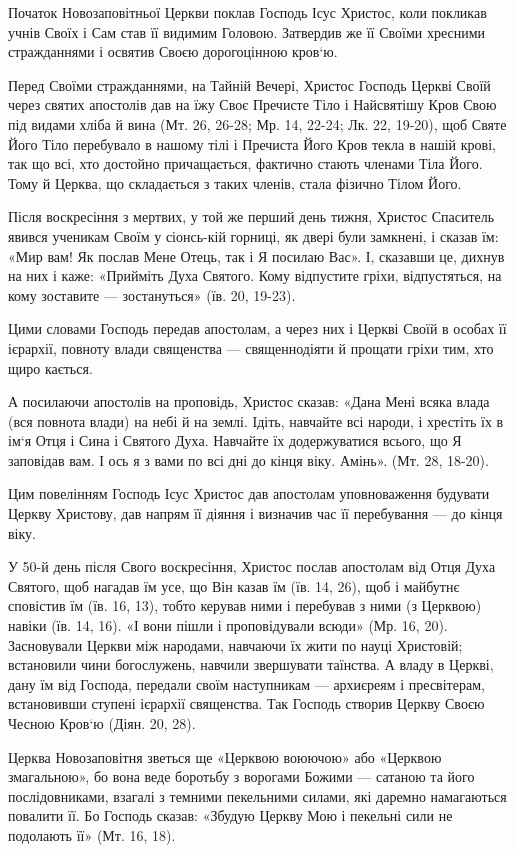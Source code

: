 \documentclass[main.tex]{subfiles}
\begin{document}
Початок Новозаповітньої Церкви поклав Господь Ісус Христос, коли покликав учнів Своїх і Сам став її видимим Головою. Затвердив же її Своїми хресними стражданнями і освятив Своєю дорогоцінною кров`ю.

Перед Своїми стражданнями, на Тайній Вечері, Христос Господь Церкві Своїй через святих апостолів дав на їжу Своє Пречисте Тіло і Найсвятішу Кров Свою під видами хліба й вина (Мт. 26, 26-28; Мр. 14, 22-24; Лк. 22, 19-20), щоб Святе Його Тіло перебувало в нашому тілі і Пречиста Його Кров текла в нашій крові, так що всі, хто достойно причащається, фактично стають членами Тіла Його. Тому й Церква, що складається з таких членів, стала фізично Тілом Його.

Після воскресіння з мертвих, у той же перший день тижня, Христос Спаситель явився ученикам Своїм у сіонсь-кій горниці, як двері були замкнені, і сказав їм: «Мир вам! Як послав Мене Отець, так і Я посилаю Вас». І, сказавши це, дихнув на них і каже: «Прийміть Духа Святого. Кому відпустите гріхи, відпустяться, на кому зоставите — зостануться» (їв. 20, 19-23).

Цими словами Господь передав апостолам, а через них і Церкві Своїй в особах її ієрархії, повноту влади священства — священнодіяти й прощати гріхи тим, хто щиро кається.

А посилаючи апостолів на проповідь, Христос сказав: «Дана Мені всяка влада (вся повнота влади) на небі й на землі. Ідіть, навчайте всі народи, і хрестіть їх в ім`я Отця і Сина і Святого Духа. Навчайте їх додержуватися всього, що Я заповідав вам. І ось я з вами по всі дні до кінця віку. Амінь». (Мт. 28, 18-20).

Цим повелінням Господь Ісус Христос дав апостолам уповноваження будувати Церкву Христову, дав напрям її діяння і визначив час її перебування — до кінця віку.

У 50-й день після Свого воскресіння, Христос послав апостолам від Отця Духа Святого, щоб нагадав їм усе, що Він казав їм (їв. 14, 26), щоб і майбутнє сповістив їм (їв. 16, 13), тобто керував ними і перебував з ними (з Церквою) навіки (їв. 14, 16). «І вони пішли і проповідували всюди» (Мр. 16, 20). Засновували Церкви між народами, навчаючи їх жити по науці Христовій; встановили чини богослужень, навчили звершувати таїнства. А владу в Церкві, дану їм від Господа, передали своїм наступникам — архиєреям і пресвітерам, встановивши ступені ієрархії священства.
Так Господь створив Церкву Своєю Чесною Кров`ю (Діян. 20, 28).

Церква Новозаповітня зветься ще «Церквою воюючою» або «Церквою змагальною», бо вона веде боротьбу з ворогами Божими — сатаною та його послідовниками, взагалі з темними пекельними силами, які даремно намагаються повалити її. Бо Господь сказав: «Збудую Церкву Мою і пекельні сили не подолають її» (Мт. 16, 18).
\end{document}
